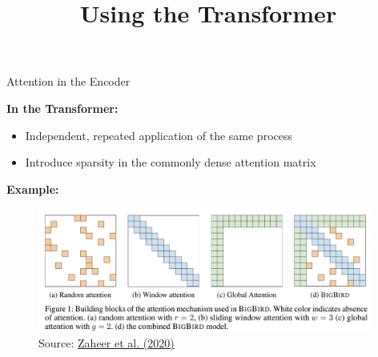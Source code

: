 



\newcommand{\titlefigure}{figure/sesamestreet.jpeg}
\newcommand{\learninggoals}{
\item Understand subtleties of Self-Attention
\item BigBird architecture using patterns}

\title{Using the Transformer}
\date{}




\begin{frame}{Attention in the Encoder}

\vfill

\textbf{In the Transformer:} 

\begin{itemize}
	\item Independent, repeated application of the same process 
	\item Introduce sparsity in the commonly dense attention matrix
\end{itemize}

\textbf{Example:}

	\begin{figure}
		\centering
		\includegraphics[width = 11cm]{figure/bigbird-patterns.png}\\ 
		{\footnotesize Source: \href{https://proceedings.neurips.cc//paper/2020/file/c8512d142a2d849725f31a9a7a361ab9-Paper.pdf}{Zaheer et al. (2020)}}
	\end{figure}
	
\vfill

\end{frame}


